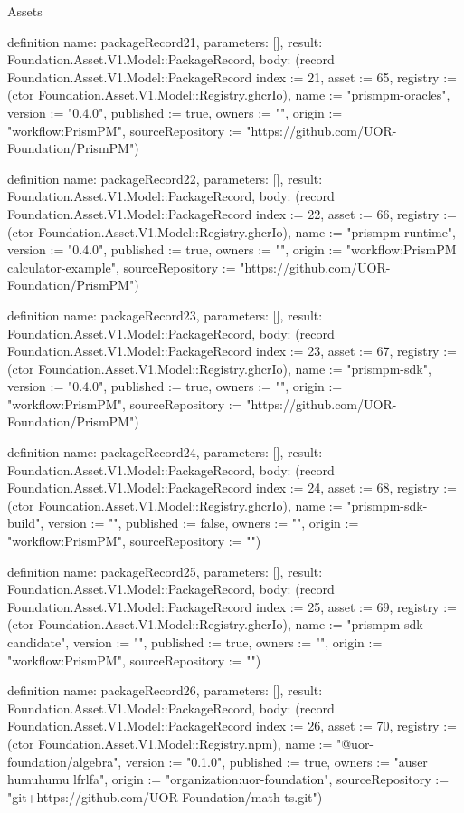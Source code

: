 \begin{lexlean}{Assets}
\begin{semanticmodule}
definition{
  name: packageRecord21,
  parameters: [],
  result: Foundation.Asset.V1.Model::PackageRecord,
  body: (record Foundation.Asset.V1.Model::PackageRecord {index := 21, asset := 65, registry := (ctor Foundation.Asset.V1.Model::Registry.ghcrIo), name := "prismpm-oracles", version := "0.4.0", published := true, owners := "", origin := "workflow:PrismPM", sourceRepository := "https://github.com/UOR-Foundation/PrismPM"})
}

definition{
  name: packageRecord22,
  parameters: [],
  result: Foundation.Asset.V1.Model::PackageRecord,
  body: (record Foundation.Asset.V1.Model::PackageRecord {index := 22, asset := 66, registry := (ctor Foundation.Asset.V1.Model::Registry.ghcrIo), name := "prismpm-runtime", version := "0.4.0", published := true, owners := "", origin := "workflow:PrismPM calculator-example", sourceRepository := "https://github.com/UOR-Foundation/PrismPM"})
}

definition{
  name: packageRecord23,
  parameters: [],
  result: Foundation.Asset.V1.Model::PackageRecord,
  body: (record Foundation.Asset.V1.Model::PackageRecord {index := 23, asset := 67, registry := (ctor Foundation.Asset.V1.Model::Registry.ghcrIo), name := "prismpm-sdk", version := "0.4.0", published := true, owners := "", origin := "workflow:PrismPM", sourceRepository := "https://github.com/UOR-Foundation/PrismPM"})
}

definition{
  name: packageRecord24,
  parameters: [],
  result: Foundation.Asset.V1.Model::PackageRecord,
  body: (record Foundation.Asset.V1.Model::PackageRecord {index := 24, asset := 68, registry := (ctor Foundation.Asset.V1.Model::Registry.ghcrIo), name := "prismpm-sdk-build", version := "", published := false, owners := "", origin := "workflow:PrismPM", sourceRepository := ""})
}

definition{
  name: packageRecord25,
  parameters: [],
  result: Foundation.Asset.V1.Model::PackageRecord,
  body: (record Foundation.Asset.V1.Model::PackageRecord {index := 25, asset := 69, registry := (ctor Foundation.Asset.V1.Model::Registry.ghcrIo), name := "prismpm-sdk-candidate", version := "", published := true, owners := "", origin := "workflow:PrismPM", sourceRepository := ""})
}

definition{
  name: packageRecord26,
  parameters: [],
  result: Foundation.Asset.V1.Model::PackageRecord,
  body: (record Foundation.Asset.V1.Model::PackageRecord {index := 26, asset := 70, registry := (ctor Foundation.Asset.V1.Model::Registry.npm), name := "@uor-foundation/algebra", version := "0.1.0", published := true, owners := "auser humuhumu lfrlfa", origin := "organization:uor-foundation", sourceRepository := "git+https://github.com/UOR-Foundation/math-ts.git"})
}


\end{semanticmodule}
\end{lexlean}
